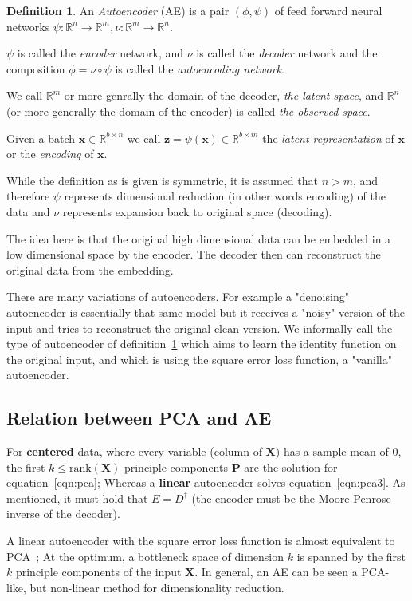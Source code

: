 \documentclass[11pt, a4paper]{report}
\theoremstyle{plain}
\theoremstyle{definition}
\newtheorem{mydef}{Definition}[chapter]
\theoremstyle{remark}
\newcommand{\R}{\mathbb{R}}
\newcommand{\x}{\mathbf{x}}
\newcommand{\z}{\mathbf{z}}
\newcommand{\bv}[1]{\boldsymbol{#1}}
\begin{document}
\begin{mydef}
\label{def:autoencoder}
An \textit{Autoencoder} (AE) is a pair 
$(\phi, \psi)$ of feed forward neural networks 
$\psi : \R^n \to \R^m, \nu : \R^m \to \R^n$.

$\psi$ is called the \emph{encoder} network, and $\nu$ is called the
\emph{decoder} network and the composition
$\phi = \nu \circ \psi$ is called the \emph{autoencoding network}. 

We call $\R^m$ or more genrally the domain of the decoder, \emph{the latent
space}, and $\R^n$ (or more generally the domain of the encoder) is called
\emph{the observed space}.

Given a batch $\x \in \R^{b \times n}$ we call $\z = \psi(\x) \in \R^{b \times m}$
the \emph{latent representation} of $\x$ or the \emph{encoding} of $\x$.
\end{mydef}

While the definition as is given is symmetric, it is assumed that $n > m$, and
therefore $\psi$ represents dimensional reduction (in other words encoding) of
the data and $\nu$ represents expansion back to original space (decoding).

The idea here is that the original high dimensional data can be embedded
in a low dimensional space by the encoder. The decoder then can reconstruct the
original data from the embedding.

There are many variations of autoencoders. For example a "denoising" autoencoder is
essentially that same model but it receives a "noisy" version of the input and
tries to reconstruct the original clean version.
We informally call the type of autoencoder of
definition~\ref{def:autoencoder} which aims to learn the identity function 
on the original input, and which is using the square error loss function, 
a "vanilla" autoencoder. 

\subsection{Relation between PCA and AE}
For \textbf{centered} data, where every variable (column of $\bv{X}$)
has a sample mean of $0$, the first $k \leq \text{rank}(\bv{X})$ principle components
$\bv{P}$ are the solution for equation~\ref{eqn:pca}; Whereas a \textbf{linear}
autoencoder solves equation~\ref{eqn:pca3}. As mentioned, it must hold that $E =
D^{\dagger}$ (the encoder must be the Moore-Penrose inverse of the decoder).

A linear autoencoder with the  square error
loss function is almost equivalent to
PCA~\cite{plaut2018principal}; At the optimum, a bottleneck space of dimension $k$
is spanned by the first $k$ principle components of the input $\bv{X}$.
In general, an AE can be seen a PCA-like, but non-linear method for
dimensionality reduction.
\end{document}
